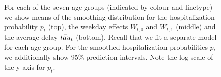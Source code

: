 \begin{figure}
   \resizebox{\textwidth}{!}{%
        
}
    \caption{For each of the seven age groups (indicated by colour and linetype) we show means of the smoothing distribution for the hospitalization probability $p_t$ (top), the weekday effects $W_{t,0}$ and $W_{t,1}$ (middle) and the average delay $\bar{\\tau}_t$ (bottom). Recall that we fit a separate model for each age group. For the smoothed hospitalization probabilities $p_t$ we additionally show 95\% prediction intervals. Note the log-scale of the y-axis for $p_t$.}
    \label{fig:hospitalization_showcase_results_states}
\end{figure}
